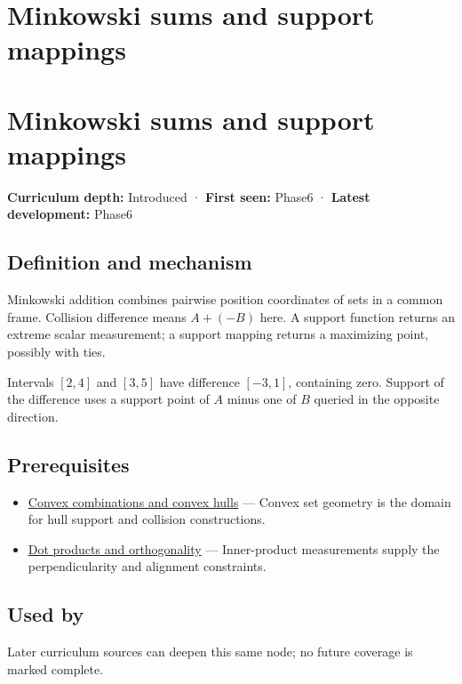 \hypertarget{appendix-215ac7099a82}{}
\section*{Minkowski sums and support mappings}
\section{Minkowski sums and support mappings}\label{minkowski-sums-and-support-mappings}

\textbf{Curriculum depth:} Introduced · \textbf{First seen:} Phase6 · \textbf{Latest development:} Phase6

\subsection{Definition and mechanism}\label{definition-and-mechanism}

Minkowski addition combines pairwise position coordinates of sets in a common frame. Collision difference means \(A+(-B)\) here. A support function returns an extreme scalar measurement; a support mapping returns a maximizing point, possibly with ties.

Intervals \([2,4]\) and \([3,5]\) have difference \([-3,1]\), containing zero. Support of the difference uses a support point of \(A\) minus one of \(B\) queried in the opposite direction.

\subsection{Prerequisites}\label{prerequisites}

\begin{itemize}
\tightlist
\item
  \hyperref[appendix-0026ec42c9d5]{Convex combinations and convex hulls} --- Convex set geometry is the domain for hull support and collision constructions.
\item
  \hyperref[appendix-8bc4e8fc547c]{Dot products and orthogonality} --- Inner-product measurements supply the perpendicularity and alignment constraints.
\end{itemize}

\subsection{Used by}\label{used-by}

Later curriculum sources can deepen this same node; no future coverage is marked complete.

